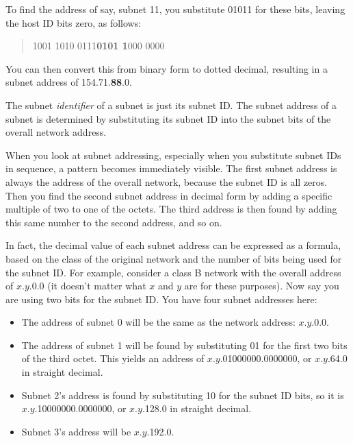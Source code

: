 To find the address of say, subnet 11, you substitute 01011 for these
bits, leaving the host ID bits zero, as follows:

\begin{quote}
   1001 1010 0111\quad \textbf{0101 1}000 0000
\end{quote}

You can then convert this from binary form to dotted decimal, resulting in a subnet address of 154.71.\textbf{88}.0.


\begin{keyconcept}
The subnet {\emph{identifier}} of a subnet is just its subnet ID.
The subnet address of a subnet is determined by substituting its subnet ID into the subnet bits of the overall network address.
\end{keyconcept}

When you look at subnet addressing, especially when you substitute
subnet IDs in sequence, a pattern becomes immediately visible. The first
subnet address is always the address of the overall network, because the
subnet ID is all zeros. Then you find the second subnet address in
decimal form by adding a specific multiple of two to one of the octets.
The third address is then found by adding this same number to the second
address, and so on.

In fact, the decimal value of each subnet address can be expressed as a
formula, based on the class of the original network and the number of
bits being used for the subnet ID. For example, consider a class B
network with the overall address of $x$.$y$.0.0 (it doesn't matter what $x$ and $y$ are for these purposes).
Now say you are using two bits for the subnet ID.
You have four subnet addresses here:

\begin{itemize}
\item
  The address of subnet 0 will be the same as the network address: $x$.$y$.0.0.
\item
  The address of subnet 1 will be found by substituting 01 for the first two bits of the third octet.
  This yields an address of $x$.$y$.01000000.0000000, or $x$.$y$.64.0 in straight decimal.
\item
  Subnet 2's address is found by substituting 10 for the subnet ID bits,
  so it is $x$.$y$.10000000.0000000, or $x$.$y$.128.0 in straight decimal.
\item
  Subnet 3's address will be $x$.$y$.192.0.
\end{itemize}

